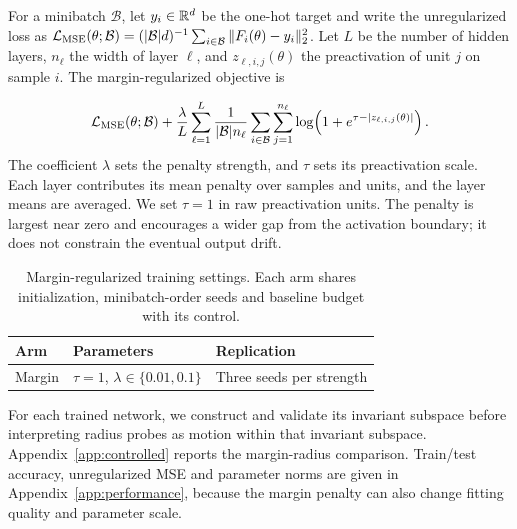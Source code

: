 For a minibatch $\mathcal B$, let $y_i\in\mathbb R^d$ be the one-hot target and write the unregularized loss as $\mathcal L_{\rm MSE}(\theta;\mathcal B)=(|\mathcal B|d)^{-1}\sum_{i\in\mathcal B}\|F_i(\theta)-y_i\|_2^2$. Let $L$ be the number of hidden layers, $n_\ell$ the width of layer $\ell$, and $z_{\ell,i,j}(\theta)$ the preactivation of unit $j$ on sample $i$. The margin-regularized objective is

\[
 \mathcal L_{\rm MSE}(\theta;\mathcal B)
 +\frac{\lambda}{L}\sum_{\ell=1}^L\frac{1}{|\mathcal B|n_\ell}
    \sum_{i\in\mathcal B}\sum_{j=1}^{n_\ell}
       \log\!\left(1+e^{\tau-|z_{\ell,i,j}(\theta)|}\right).
\]
The coefficient $\lambda$ sets the penalty strength, and $\tau$ sets its preactivation scale. Each layer contributes its mean penalty over samples and units, and the layer means are averaged. We set $\tau=1$ in raw preactivation units. The penalty is largest near zero and encourages a wider gap from the activation boundary; it does not constrain the eventual output drift.

\begin{table}[!htbp]\centering
\caption{Margin-regularized training settings. Each arm shares initialization, minibatch-order seeds and baseline budget with its control.}\label{tab:early-method-interventions}
\small\begin{tabular}{lll}\toprule
Arm & Parameters & Replication\\\midrule
Margin & $\tau=1$, $\lambda\in\{0.01,0.1\}$ & Three seeds per strength\\
\bottomrule
\end{tabular}
\end{table}

For each trained network, we construct and validate its invariant subspace before interpreting radius probes as motion within that invariant subspace. Appendix~\ref{app:controlled} reports the margin-radius comparison. Train/test accuracy, unregularized MSE and parameter norms are given in Appendix~\ref{app:performance}, because the margin penalty can also change fitting quality and parameter scale.


